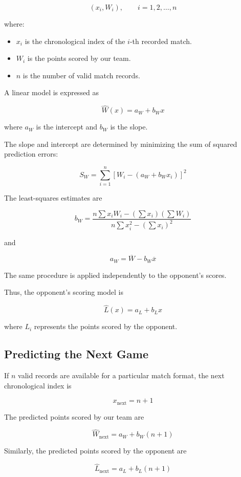 \[
(x_i,W_i), \qquad i=1,2,\ldots,n
\]

where:

\begin{itemize}
    \item $x_i$ is the chronological index of the
    $i$-th recorded match.
    \item $W_i$ is the points scored by our team.
    \item $n$ is the number of valid match records.
\end{itemize}

A linear model is expressed as

\[
\widehat{W}(x)=a_W+b_Wx
\]

where $a_W$ is the intercept and $b_W$ is the slope.

The slope and intercept are determined by minimizing
the sum of squared prediction errors:

\[
S_W =
\sum_{i=1}^{n}
\left[W_i-(a_W+b_Wx_i)\right]^2
\]

The least-squares estimates are

\[
b_W =
\frac{
n\sum x_iW_i-(\sum x_i)(\sum W_i)
}{
n\sum x_i^2-(\sum x_i)^2
}
\]

and

\[
a_W=\overline{W}-b_W\overline{x}
\]

The same procedure is applied independently to the
opponent's scores.

Thus, the opponent's scoring model is

\[
\widehat{L}(x)=a_L+b_Lx
\]

where $L_i$ represents the points scored by the
opponent.

\subsection{Predicting the Next Game}

If $n$ valid records are available for a particular
match format, the next chronological index is

\[
x_{\text{next}}=n+1
\]

The predicted points scored by our team are

\[
\widehat{W}_{\text{next}}
=
a_W+b_W(n+1)
\]

Similarly, the predicted points scored by the
opponent are

\[
\widehat{L}_{\text{next}}
=
a_L+b_L(n+1)
\]

